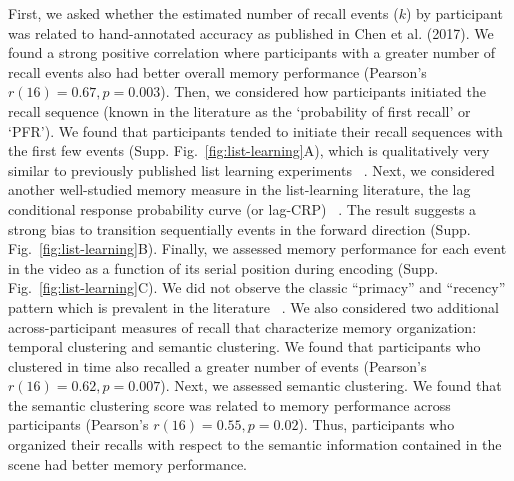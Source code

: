 \documentclass{article}
\begin{document}
First, we asked whether the estimated number of recall events ($k$) by participant was related to hand-annotated accuracy as published in Chen et al. (2017).  We found a strong positive correlation where participants with a greater number of recall events also had better overall memory performance (Pearson's $r(16) = 0.67, p = 0.003$). Then, we considered how participants initiated the recall sequence (known in the literature as the `probability of first recall' or `PFR'). We found that participants tended to initiate their recall sequences with the first few events (Supp. Fig.~\ref{fig:list-learning}A), which is qualitatively very similar to previously published list learning experiments ~\citep{HowaKaha99}. Next, we considered another well-studied memory measure in the list-learning literature, the lag conditional response probability curve (or lag-CRP) ~\citep{Kaha96}. The result suggests a strong bias to transition sequentially events in the forward direction (Supp. Fig.~\ref{fig:list-learning}B). Finally, we assessed memory performance for each event in the video as a function of its serial position during encoding (Supp. Fig.~\ref{fig:list-learning}C). We did not observe the classic ``primacy'' and ``recency'' pattern which is prevalent in the literature ~\citep{Murd62a}. We also considered two additional across-participant measures of recall that characterize memory organization: temporal clustering and semantic clustering. We found that participants who clustered in time also recalled a greater number of events (Pearson's $r(16) = 0.62, p = 0.007$). Next, we assessed semantic clustering. We found that the semantic clustering score was related to memory performance across participants (Pearson's $r(16) = 0.55, p = 0.02$).  Thus, participants who organized their recalls with respect to the semantic information contained in the scene had better memory performance.
\end{document}
